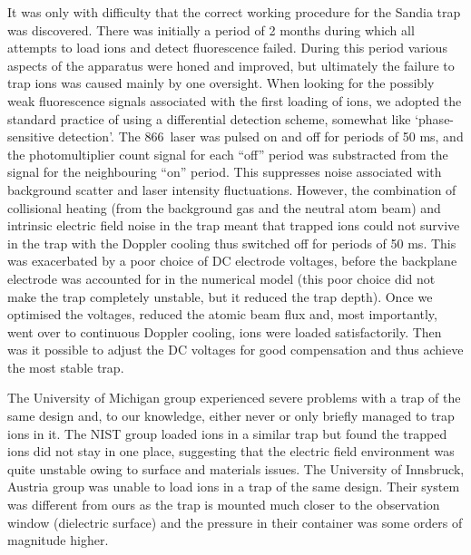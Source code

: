 It was only with difficulty that the correct working procedure for the Sandia trap was discovered. There was initially a period of 2 months during which all attempts to load ions and detect fluorescence failed. During this period various aspects of the apparatus were honed and improved, but ultimately the failure to trap ions was caused
mainly by one oversight. When looking for the possibly weak fluorescence signals associated with the first loading of ions, we adopted the standard practice of using a differential detection scheme, somewhat like `phase-sensitive detection'. The 866\nm\, laser was pulsed on and off for periods of 50 ms, and the photomultiplier count signal for each ``off'' period was substracted from the signal for the neighbouring ``on'' period. This suppresses noise associated with background scatter and laser intensity fluctuations. However, the combination of collisional heating (from the background gas and the neutral atom beam) and intrinsic electric field noise in the trap meant that trapped ions could not survive in the trap with the Doppler cooling thus switched off for periods of 50 ms. This was exacerbated by a poor choice of DC electrode voltages, before the backplane electrode was accounted for in the numerical model (this poor choice did not make the trap completely unstable, but it reduced the trap depth). Once we optimised the voltages, reduced the atomic beam flux and, most importantly, went over to continuous Doppler cooling, ions were loaded satisfactorily. Then was it possible to adjust the DC voltages for good compensation and thus achieve the
most stable trap.

The University of Michigan group experienced severe problems with a trap of the same design and, to our knowledge, either never or only briefly managed to trap ions in it. The NIST group loaded ions in a similar trap but found the trapped ions did not stay in one place, suggesting that the electric field environment was quite unstable owing to surface and materials issues. The University of Innsbruck, Austria group was unable to load ions in a trap of the same design. Their system was different from ours as the trap is mounted much closer to the observation window (dielectric surface) and the pressure in their container was some orders of magnitude higher.


